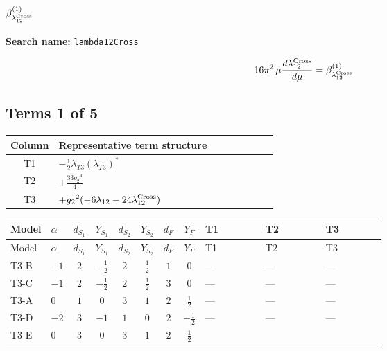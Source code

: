 \documentclass[8pt]{article}
\begin{document}
\begin{landscape}
\section*{$\beta_{\lambda_{12}^{\rm Cross}}^{(1)}$}
\noindent\textbf{Search name: }\texttt{lambda12Cross}\par\smallskip
\[16\pi^2\,\mu\frac{d \lambda_{12}^{\rm Cross}}{d\mu}=\beta_{\lambda_{12}^{\rm Cross}}^{(1)}\]
\subsection*{Terms 1 of 5}
\begin{center}
\begin{tabular}{@{}c >{\raggedright\arraybackslash}p{0.82\linewidth}@{}}
\toprule
Column & Representative term structure \\
\midrule
T1 & \(\displaystyle -\frac{1}{2} {\lambda_{T3}} \left({\lambda_{T3}}\right)^{*}\) \\
\midrule
T2 & \(\displaystyle +\frac{33 {g_2}^4}{4}\) \\
\midrule
T3 & \(\displaystyle +{g_2}^2 (-6 {\lambda_{12}}-24 {\lambda_{12}^{\rm Cross}})\) \\
\midrule
\bottomrule
\end{tabular}
\end{center}
\smallskip
\tiny
\begin{longtable}{@{}llcccccc >{\raggedright\arraybackslash}p{0.21\linewidth} >{\raggedright\arraybackslash}p{0.21\linewidth} >{\raggedright\arraybackslash}p{0.21\linewidth}@{}}
\toprule
Model & $\alpha$ & $d_{S_1}$ & $Y_{S_1}$ & $d_{S_2}$ & $Y_{S_2}$ & $d_F$ & $Y_F$ & T1 & T2 & T3 \\
\midrule
\endfirsthead
\toprule
Model & $\alpha$ & $d_{S_1}$ & $Y_{S_1}$ & $d_{S_2}$ & $Y_{S_2}$ & $d_F$ & $Y_F$ & T1 & T2 & T3 \\
\midrule
\endhead
T3-B & $-1$ & $2$ & $-\frac{1}{2}$ & $2$ & $\frac{1}{2}$ & $1$ & $0$ & --- & --- & --- \\
\midrule
T3-C & $-1$ & $2$ & $-\frac{1}{2}$ & $2$ & $\frac{1}{2}$ & $3$ & $0$ & --- & --- & --- \\
\midrule
T3-A & $0$ & $1$ & $0$ & $3$ & $1$ & $2$ & $\frac{1}{2}$ & --- & --- & --- \\
\midrule
T3-D & $-2$ & $3$ & $-1$ & $1$ & $0$ & $2$ & $-\frac{1}{2}$ & --- & --- & --- \\
\midrule
T3-E & $0$ & $3$ & $0$ & $3$ & $1$ & $2$ & $\frac{1}{2}$ & \scriptsize\adjustbox{max width=\linewidth}{$\begin{gathered} -\frac{1}{2} {\lambda_{T3}} \left({\lambda_{T3}}\right)^{*}\end{gathered}$} & \scriptsize\adjustbox{max width=\linewidth}{$\begin{gathered} +\frac{33 {g_2}^4}{4}\end{gathered}$} & \scriptsize\adjustbox{max width=\linewidth}{$\begin{gathered} +{g_2}^2 (-6 {\lambda_{12}}-24 {\lambda_{12}^{\rm Cross}})\end{gathered}$} \\

\end{longtable}
\end{landscape}
\end{document}
